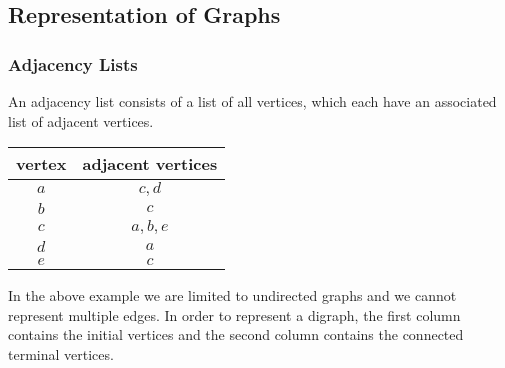 \documentclass[a4paper, 10pt]{article}
\begin{document}
\subsection{Representation of Graphs}

\subsubsection{Adjacency Lists}
An adjacency list consists of a list of all vertices, which each have an associated list of adjacent vertices.
\begin{multicols}{2}
    \begin{center}
    \end{center}
    \begin{tabular}{| c | c |}
        \hline
        vertex & adjacent vertices \\
        \hline
        \(a\)  & \(c,d\) \\
        \(b\)  & \(c\) \\
        \(c\)  & \(a,b,e\) \\
        \(d\)  & \(a\) \\
        \(e\)  & \(c\) \\
        \hline
    \end{tabular}
\end{multicols}
In the above example we are limited to undirected graphs and we cannot represent multiple edges. In order to represent a digraph, the first column contains the initial vertices and the second column contains the connected terminal vertices.
\end{document}
